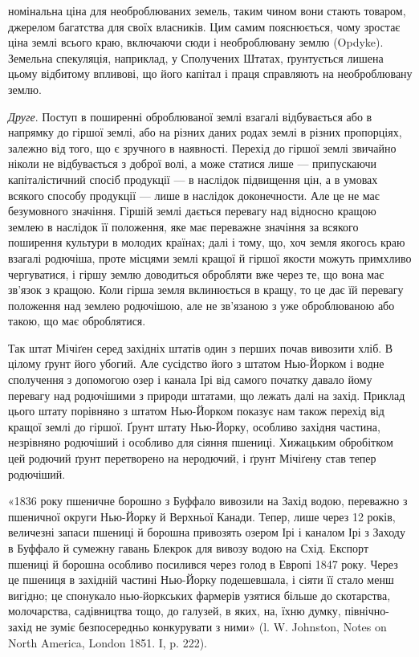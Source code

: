 \parcont{}  %
номінальна ціна для необроблюваних земель, таким чином вони стають товаром,
джерелом багатства для своїх власників. Цим самим пояснюється, чому зростає ціна
землі всього краю, включаючи сюди і необроблювану землю (Opdyke).
Земельна спекуляція, наприклад, у Сполучених Штатах, ґрунтується лишена цьому
відбитому впливові, що його капітал і праця справляють на необроблювану землю.

\emph{Друге}. Поступ в поширенні оброблюваної землі взагалі відбувається або в
напрямку до гіршої землі, або на різних даних родах землі в різних пропорціях,
залежно від того, що є зручного в наявності. Перехід до гіршої землі звичайно
ніколи не відбувається з доброї волі, а може статися лише — припускаючи капіталістичний спосіб
продукції — в наслідок підвищення цін, а в умовах всякого
способу продукції — лише в наслідок доконечности. Але це не має безумовного значіння. Гіршій землі
дається перевагу над відносно кращою землею в наслідок
її положення, яке має переважне значіння за всякого поширення культури
в молодих країнах; далі і тому, що, хоч земля якогось краю взагалі родючіша,
проте місцями землі кращої й гіршої якости можуть примхливо чергуватися, і
гіршу землю доводиться обробляти вже через те, що вона має зв’язок з кращою.
Коли гірша земля вклинюється в кращу, то це дає їй перевагу положення
над землею родючішою, але не зв’язаною з уже оброблюваною або такою, що має
оброблятися.

Так штат Мічіґен серед західніх штатів один з перших почав вивозити
хліб. В цілому ґрунт його убогий. Але сусідство його з штатом Нью-Йорком і
водне сполучення з допомогою озер і канала Ірі від самого початку давало йому
перевагу над родючішими з природи штатами, що лежать далі на захід.
Приклад цього штату порівняно з штатом Нью-Йорком показує нам також
перехід від кращої землі до гіршої. Ґрунт штату Нью-Йорку, особливо західня
частина, незрівняно родючіший і особливо для сіяння пшениці. Хижацьким обробітком
цей родючий ґрунт перетворено на неродючий, і ґрунт Мічіґену став тепер
родючіший.

«1836 року пшеничне борошно з Буффало вивозили на Захід водою, переважно
з пшеничної округи Нью-Йорку й Верхньої Канади. Тепер, лише через
12 років, величезні запаси пшениці й борошна привозять озером Ірі і каналом
Ірі з Заходу в Буффало й сумежну гавань Блекрок для вивозу водою на
Схід. Експорт пшениці й борошна особливо посилився через голод в Европі
1847 року. Через це пшениця в західній частині Нью-Йорку подешевшала, і
сіяти її стало менш вигідно; це спонукало нью-йоркських фармерів узятися
більше до скотарства, молочарства, садівництва тощо, до галузей, в яких, на,
їхню думку, північно-захід не зуміє безпосередньо конкурувати з ними» (l. W.
Johnston, Notes on North America, London 1851. I, p. 222).

